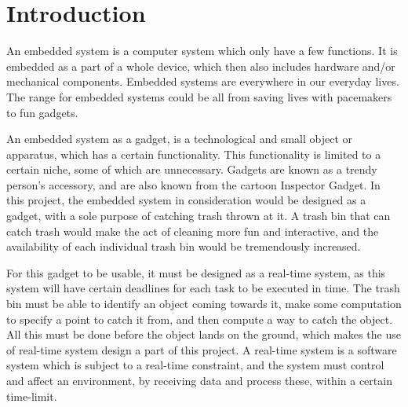 \chapter{Introduction}
\label{chap:Introduction}

An embedded system is a computer system which only have a few functions. It is embedded as a part of a whole device, which then also includes hardware and/or mechanical components. Embedded systems are everywhere in our everyday lives. The range for embedded systems could be all from saving lives with pacemakers to fun gadgets.\citep{es}

An embedded system as a gadget, is a technological and small object or apparatus, which has a certain functionality. This functionality is limited to a certain niche, some of which are unnecessary. Gadgets are known as a trendy person’s accessory, and are also known from the cartoon Inspector Gadget. \newline
In this project, the embedded system in consideration would be designed as a gadget, with a sole purpose of catching trash thrown at it. A trash bin that can catch trash would make the act of cleaning more fun and interactive, and the availability of each individual trash bin would be tremendously increased.

For this gadget to be usable, it must be designed as a real-time system, as this system will have certain deadlines for each task to be executed in time. The trash bin must be able to identify an object coming towards it, make some computation to specify a point to catch it from, and then compute a way to catch the object. All this must be done before the object lands on the ground, which makes the use of real-time system design a part of this project. A real-time system is a software system which is subject to a real-time constraint, and the system must control and affect an environment, by receiving data and process these, within a certain time-limit.